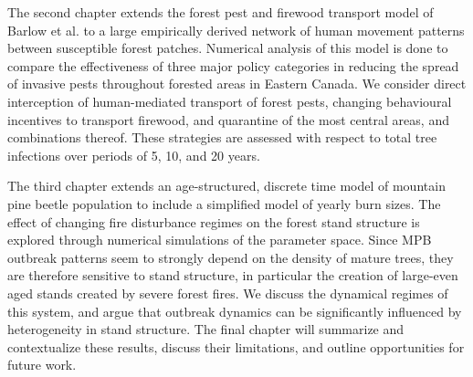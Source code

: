 The second chapter extends the forest pest and firewood transport model of Barlow et al. \cite{barlow2014modelling} to a large empirically derived network of human movement patterns between susceptible forest patches. Numerical analysis of this model is done to compare the effectiveness of three major policy categories in reducing the spread of invasive pests throughout forested areas in Eastern Canada. We consider direct interception of human-mediated transport of forest pests, changing behavioural incentives to transport firewood, and quarantine of the most central areas, and combinations thereof. These strategies are assessed with respect to total tree infections over periods of 5, 10, and 20 years.

The third chapter extends an age-structured, discrete time model of mountain pine beetle population \cite{duncan2015model} to include a simplified model of yearly burn sizes. The effect of changing fire disturbance regimes on the forest stand structure is explored through numerical simulations of the parameter space. Since MPB outbreak patterns seem to strongly depend on the density of mature trees, they are therefore sensitive to stand structure, in particular the creation of large-even aged stands created by severe forest fires. We discuss the dynamical regimes of this system, and argue that outbreak dynamics can be significantly influenced by heterogeneity in stand structure. The final chapter will summarize and contextualize these results, discuss their limitations, and outline opportunities for future work.

